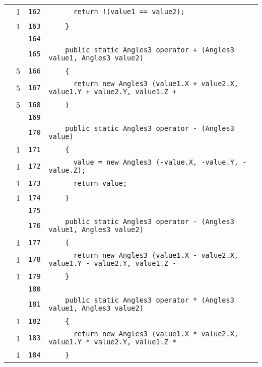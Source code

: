 \documentclass[a4paper,10pt]{article}
\begin{document}
\begin{longtable}[l]{lrrl}
\cellcolor{green} & 1 & \verb~162~ & \verb~      return !(value1 == value2);~\\
\cellcolor{green} & 1 & \verb~163~ & \verb~    }~\\
\cellcolor{gray} &  & \verb~164~ & \verb~~\\
\cellcolor{gray} &  & \verb~165~ & \verb~    public static Angles3 operator + (Angles3 value1, Angles3 value2)~\\
\cellcolor{green} & 5 & \verb~166~ & \verb~    {~\\
\cellcolor{green} & 5 & \verb~167~ & \verb~      return new Angles3 (value1.X + value2.X, value1.Y + value2.Y, value1.Z +~\\
\cellcolor{green} & 5 & \verb~168~ & \verb~    }~\\
\cellcolor{gray} &  & \verb~169~ & \verb~~\\
\cellcolor{gray} &  & \verb~170~ & \verb~    public static Angles3 operator - (Angles3 value)~\\
\cellcolor{green} & 1 & \verb~171~ & \verb~    {~\\
\cellcolor{green} & 1 & \verb~172~ & \verb~      value = new Angles3 (-value.X, -value.Y, -value.Z);~\\
\cellcolor{green} & 1 & \verb~173~ & \verb~      return value;~\\
\cellcolor{green} & 1 & \verb~174~ & \verb~    }~\\
\cellcolor{gray} &  & \verb~175~ & \verb~~\\
\cellcolor{gray} &  & \verb~176~ & \verb~    public static Angles3 operator - (Angles3 value1, Angles3 value2)~\\
\cellcolor{green} & 1 & \verb~177~ & \verb~    {~\\
\cellcolor{green} & 1 & \verb~178~ & \verb~      return new Angles3 (value1.X - value2.X, value1.Y - value2.Y, value1.Z -~\\
\cellcolor{green} & 1 & \verb~179~ & \verb~    }~\\
\cellcolor{gray} &  & \verb~180~ & \verb~~\\
\cellcolor{gray} &  & \verb~181~ & \verb~    public static Angles3 operator * (Angles3 value1, Angles3 value2)~\\
\cellcolor{green} & 1 & \verb~182~ & \verb~    {~\\
\cellcolor{green} & 1 & \verb~183~ & \verb~      return new Angles3 (value1.X * value2.X, value1.Y * value2.Y, value1.Z *~\\
\cellcolor{green} & 1 & \verb~184~ & \verb~    }~\\

\end{longtable}
\end{document}
